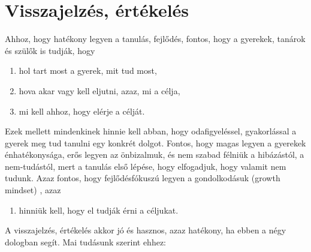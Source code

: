 \hypertarget{visszajelzes-ertekeles}{%
\section{Visszajelzés, értékelés}\label{visszajelzes-ertekeles}}

Ahhoz, hogy hatékony legyen a tanulás, fejlődés, fontos, hogy a
gyerekek, tanárok és szülők is tudják, hogy

\begin{enumerate}
\def\labelenumi{\arabic{enumi}.}
\tightlist
\item
  hol tart most a gyerek, mit tud most,
\item
  hova akar vagy kell eljutni, azaz, mi a célja,
\item
  mi kell ahhoz, hogy elérje a célját.
\end{enumerate}

Ezek mellett mindenkinek hinnie kell abban, hogy odafigyeléssel,
gyakorlással a gyerek meg tud tanulni egy konkrét dolgot. Fontos, hogy
magas legyen a gyerekek énhatékonysága, erős legyen az önbizalmuk, és
nem szabad félniük a hibázástól, a nem-tudástól, mert a tanulás első
lépése, hogy elfogadjuk, hogy valamit nem tudunk. Azaz fontos, hogy
fejlődésfókuszú legyen a gondolkodásuk (growth mindset) {\autocite{Dweck2006}}, azaz

\begin{enumerate}
\def\labelenumi{\arabic{enumi}.}
\setcounter{enumi}{3}
\tightlist
\item
  hinniük kell, hogy el tudják érni a céljukat.
\end{enumerate}

A visszajelzés, értékelés akkor jó és hasznos, azaz hatékony, ha ebben
a négy dologban segít. Mai tudásunk szerint ehhez:

